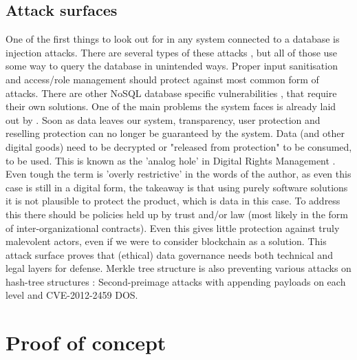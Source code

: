 \documentclass[a4paper,11pt]{report} %
\theoremstyle{change}
\theoremstyle{theoremstyle}
\begin{document}
\section{Attack surfaces}\label{sec:attack_surf}
One of the first things to look out for in any system connected to a database is injection attacks. There are several types of these attacks \cite{halfond2006classification}, but all of those use some way to query the database in unintended ways. Proper input sanitisation and access/role management should protect against most common form of attacks. There are other NoSQL database specific vulnerabilities \cite{fahd2019comparative}, that require their own solutions.
One of the main problems the system faces is already laid out by \cite{hyrynsalmi2023balancing}. Soon as data leaves our system, transparency, user protection and reselling protection can no longer be guaranteed by the system. Data (and other digital goods) need to be decrypted or "released from protection" to be consumed, to be used. This is known as the 'analog hole' in Digital Rights Management \cite{haber2003if}. Even tough the term is 'overly restrictive' in the words of the author, as even this case is still in a digital form, the takeaway is that using purely software solutions it is not plausible to protect the product, which is data in this case. To address this there should be policies held up by trust and/or law (most likely in the form of inter-organizational contracts). Even this gives little protection against truly malevolent actors, even if we were to consider blockchain as a solution. This attack surface proves that (ethical) data governance needs both technical and legal layers for defense. 
Merkle tree structure is also preventing various attacks on hash-tree structures \cite{fmerg2022pymerkle}: Second-preimage attacks with appending payloads on each level and CVE-2012-2459 DOS.





\chapter{Proof of concept}
\end{document}
